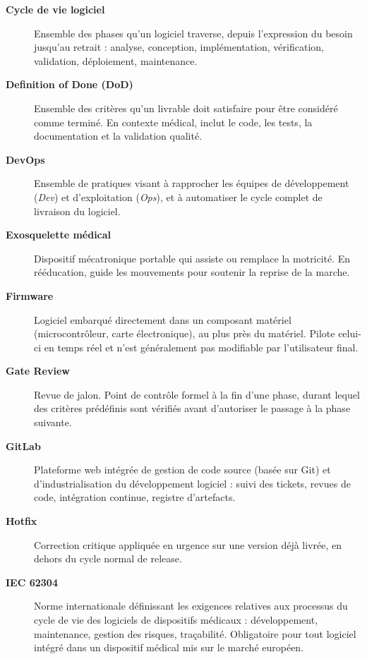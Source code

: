 \begin{description}
  \item[\textbf{Cycle de vie logiciel}] Ensemble des phases qu'un logiciel traverse, depuis l'expression du besoin jusqu'au retrait : analyse, conception, implémentation, vérification, validation, déploiement, maintenance.

  \item[\textbf{Definition of Done (DoD)}] Ensemble des critères qu'un livrable doit satisfaire pour être considéré comme terminé. En contexte médical, inclut le code, les tests, la documentation et la validation qualité.

  \item[\textbf{DevOps}] Ensemble de pratiques visant à rapprocher les équipes de développement (\textit{Dev}) et d'exploitation (\textit{Ops}), et à automatiser le cycle complet de livraison du logiciel.

  \item[\textbf{Exosquelette médical}] Dispositif mécatronique portable qui assiste ou remplace la motricité. En rééducation, guide les mouvements pour soutenir la reprise de la marche.

  \item[\textbf{Firmware}] Logiciel embarqué directement dans un composant matériel (microcontrôleur, carte électronique), au plus près du matériel. Pilote celui-ci en temps réel et n'est généralement pas modifiable par l'utilisateur final.

  \item[\textbf{Gate Review}] Revue de jalon. Point de contrôle formel à la fin d'une phase, durant lequel des critères prédéfinis sont vérifiés avant d'autoriser le passage à la phase suivante.

  \item[\textbf{GitLab}] Plateforme web intégrée de gestion de code source (basée sur Git) et d'industrialisation du développement logiciel : suivi des tickets, revues de code, intégration continue, registre d'artefacts.

  \item[\textbf{Hotfix}] Correction critique appliquée en urgence sur une version déjà livrée, en dehors du cycle normal de release.

  \item[\textbf{IEC 62304}] Norme internationale définissant les exigences relatives aux processus du cycle de vie des logiciels de dispositifs médicaux : développement, maintenance, gestion des risques, traçabilité. Obligatoire pour tout logiciel intégré dans un dispositif médical mis sur le marché européen.


\end{description}
